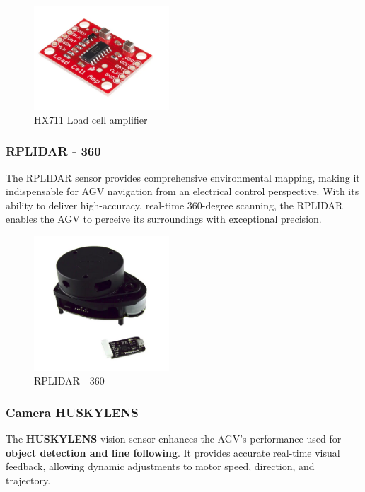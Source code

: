 \documentclass[../../main]{subfiles}
\begin{document}
\begin{figure}[H]
    \centering
    \includegraphics[width=0.45\textwidth]{fig/load_cell_amplifier.png}
    \caption{ HX711 Load cell amplifier }
    \label{HX711 Load cell amplifier} %
\end{figure}


\subsubsection{RPLIDAR - 360}

The RPLIDAR sensor provides comprehensive environmental mapping, making it indispensable for AGV navigation 
from an electrical control perspective. With its ability to deliver high-accuracy, real-time 360-degree
scanning, the RPLIDAR enables the AGV to perceive its surroundings with exceptional precision.

\begin{figure}[H]
    \centering
    \includegraphics[width=0.45\textwidth]{fig/lidar.png}
    \caption{ RPLIDAR - 360}
    \label{ RPLIDAR - 360 } %
\end{figure}


\subsubsection{Camera HUSKYLENS}

The \textbf{HUSKYLENS} vision sensor enhances the AGV’s performance 
used for \textbf{object detection and line following}. 
It provides accurate real-time visual feedback, allowing dynamic adjustments to 
motor speed, direction, and trajectory. 
\end{document}
